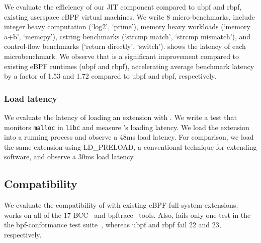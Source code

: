 We evaluate the efficiency of our \sys JIT component compared to ubpf and rbpf, existing userspace eBPF virtual machines.  We write 8 micro-benchmarks, include integer heavy computation (`log2', `prime'), memory heavy workloads (`memory a+b', `memcpy'), cstring benchmarks (`strcmp match', `strcmp mismatch'), and control-flow benchmarks (`return directly', `switch').   shows the latency of each microbenchmark.  We observe that \sys is a significant improvement compared to existing eBPF runtimes (ubpf and rbpf), accelerating average benchmark latency by a factor of 1.53 and 1.72 compared to ubpf and rbpf, respectively. 



\subsubsection{\sys Load latency}
We evaluate the latency of loading an extension with \sys.  We write a test that monitors \texttt{malloc} in \texttt{libc} and measure \sys's loading latency. We load the extension into a running process and observe a 48ms load latency.  For comparison, we load the same extension using LD\_PRELOAD, a conventional technique for extending software, and observe a 30ms load latency.

\subsection{\sys Compatibility}

We evaluate the compatibility of \sys with existing eBPF full-system extensions. \sys works on all of the 17 BCC~\cite{bcc} and bpftrace~\cite{bpftrace} tools.  Also, \sys{} fails only one test in the the bpf-conformance test suite~\cite{bpfconformance}, whereas ubpf and rbpf fail 22 and 23, respectively.
